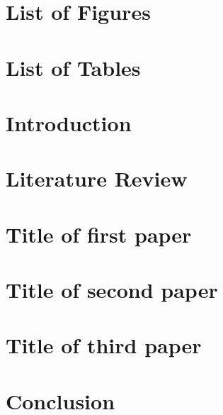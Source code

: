 \documentclass[12pt, letterpaper]{report}
\begin{document}
\renewcommand{\listfigurename}{}
\chapter*{List of Figures}  %
\listoffigures
\newpage

\renewcommand{\listtablename}{}
\chapter*{List of Tables}  %
\listoftables
\newpage

\chapter{Introduction}
\setcounter{page}{1}  %
\label{ch:introduction}


\chapter{Literature Review}
\label{ch:lit_review}


\chapter{Title of first paper}


\chapter{Title of second paper}


\chapter{Title of third paper}

\chapter{Conclusion}

 

\end{document}
